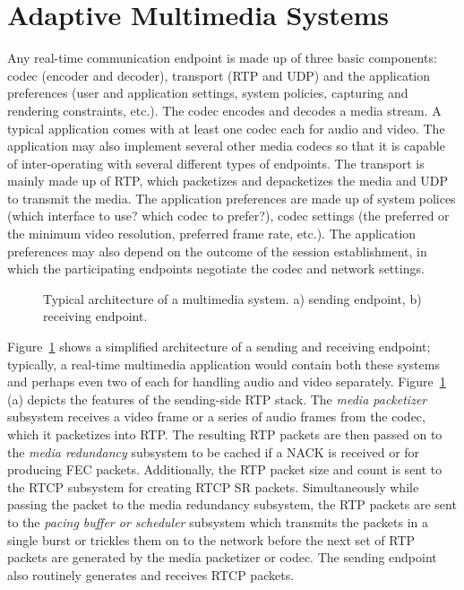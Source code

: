 \section{Adaptive Multimedia Systems}
\label{fw.amusys}

Any real-time communication endpoint is made up of three basic components:
codec (encoder and decoder), transport (RTP and UDP) and the application
preferences (user and application settings, system policies, capturing and
rendering constraints, etc.). The codec encodes and decodes a media stream. A
typical application comes with at least one codec each for audio and video. 
The application may also implement several other media codecs so that 
it is capable of inter-operating
with several different types of endpoints. The transport is mainly made up of
RTP, which packetizes and depacketizes the media and UDP to transmit the
media. The application preferences are made up of system polices (which
interface to use? which codec to prefer?), codec settings (the
preferred or the minimum video resolution, preferred frame rate, etc.). The
application preferences may also depend on the outcome of the session
establishment, in which the participating endpoints negotiate the codec and
network settings.

\begin{figure}
  \centerline{
  }
  \centerline{
  }
  
  \caption{Typical architecture of a multimedia system. a) sending endpoint,
  b) receiving endpoint.}
  \label{fig:4:appint}
\end{figure}

Figure~\ref{fig:4:appint} shows a simplified architecture of a sending and
receiving endpoint; typically, a real-time multimedia application would
contain both these systems and perhaps even two of each for handling audio and
video separately. Figure~\ref{fig:4:appint} (a) depicts the features of the
sending-side RTP stack. The \emph{media packetizer} subsystem receives a video frame or a
series of audio frames from the codec, which it packetizes into RTP.  The
resulting RTP packets are then passed on to the \emph{media redundancy} subsystem to
be cached if a NACK is received or for producing FEC packets. Additionally,
the RTP packet size and count is sent to the RTCP subsystem for creating RTCP
SR packets. Simultaneously while passing the packet to the media redundancy
subsystem, the RTP packets are sent to the \emph{pacing buffer or scheduler} subsystem which
transmits the packets in a single burst or trickles them on to the network
before the next set of RTP packets are generated by the media packetizer or codec. The
sending endpoint also routinely generates and receives RTCP packets. 

